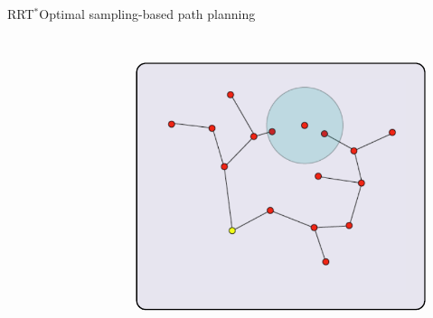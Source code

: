 \begin{frame}{RRT$^{*}$}{Optimal sampling-based path planning}
\begin{columns}
\begin{figure}
		\label{fig:rrts:01}
	\end{figure}
	\begin{figure}
		\centering
		\includegraphics[width=\linewidth]{figure/RRTs02.png}
		\label{fig:rrts:02}
	\end{figure}
\end{columns}
\end{frame}

